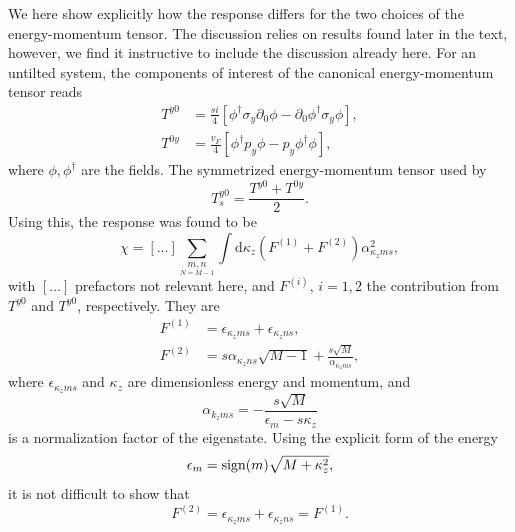We here show explicitly how the response differs for the two choices of the energy-momentum tensor.
The discussion relies on results found later in the text, however, we find it instructive to include the discussion already here.
For an untilted system, the components of interest of the canonical energy-momentum tensor reads
\begin{subequations}
\begin{align}
  T^{y 0} &= \frac{s i}{4}
  \left[
  \phi^{\dagger} \sigma_y \partial_{0} \phi - \partial_0 \phi^{\dagger} \sigma_y \phi
  \right],\\
  T^{0 y} &= \frac{v_F}{4}
  \left[
  \phi^{\dagger} p_y \phi - p_y \phi^{\dagger} \phi
  \right],
\end{align}
\end{subequations}
where \( \phi, \phi^{\dagger} \) are the fields.
The symmetrized energy-momentum tensor used by~\textcite{arjonaFingerprintsConformalAnomaly2019}
\begin{equation}
  T_s^{y 0} = \frac{T^{y 0} + T^{0 y}}{2}.
\end{equation}
Using this, the response was found to be
\begin{equation}
  \chi = [\dots] \sum\limits_{\underset{N=M-1}{m,n}}^{} \int \mathrm{d} \kappa_z (F^{(1)} + F^{(2)}) \alpha_{\kappa_z m s}^2,
\end{equation}
with \( [\dots] \) prefactors not relevant here, and \( F^{(i)},\, i=1,2 \) the contribution from \( T^{y0} \) and \( T^{y 0} \), respectively.
They are
\begin{align}
  F^{(1)} &= \epsilon_{\kappa_z m s} + \epsilon_{\kappa_z n s},\\
  F^{(2)} &= s \alpha_{\kappa_z n s} \sqrt{M-1} + \frac{s \sqrt{M}}{\alpha_{\kappa_z m s}},
\end{align}
where \( \epsilon_{\kappa_z m s} \) and \( \kappa_z \) are dimensionless energy and momentum, and
\[
  \alpha_{k_z m s} = - \frac{s \sqrt{M}}{\epsilon_{m} - s \kappa_z}
\]
is a normalization factor of the eigenstate.
Using the explicit form of the energy
\[
  \epsilon_m = \operatorname{sign} (m) \sqrt{M + \kappa_{z}^2},
\]
it is not difficult to show that
\begin{equation}
  F^{(2)} = \epsilon_{\kappa_z m s} + \epsilon_{\kappa_z n s} = F^{(1)}.
\end{equation}

